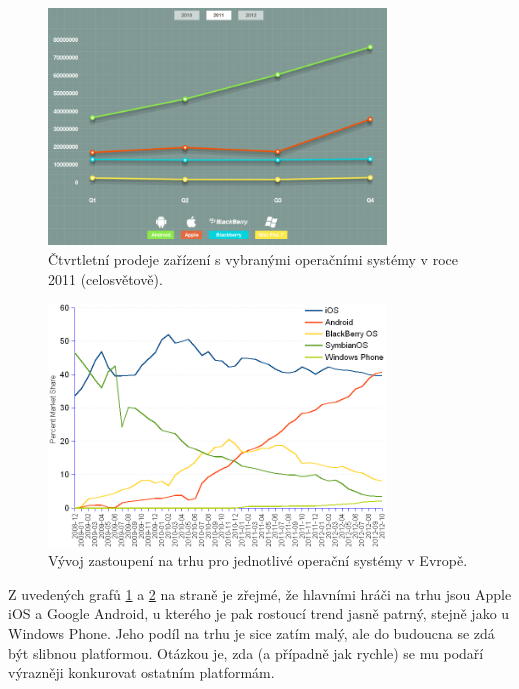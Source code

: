 \documentclass[thesis=M,czech]{FITthesis}[2012/06/26]
\begin{document}
\begin{figure}[p]\centering
	\includegraphics[width=0.8\textwidth]{figures/sales_2011}
	\caption{Čtvrtletní prodeje zařízení s vybranými operačními systémy v roce 2011 (celosvětově).\protect\cite{mobile_stats}}
	\label{fig:sales_world}
\end{figure}
\begin{figure}[p]\centering
	\includegraphics[width=0.8\textwidth]{figures/mobios_eu_timeseries_800x574}
	\caption{Vývoj zastoupení na trhu pro jednotlivé operační systémy v Evropě.\protect\cite{market_share}}
	\label{fig:sales_europe}
\end{figure}

Z uvedených grafů \ref{fig:sales_world} a \ref{fig:sales_europe} na straně \pageref{fig:sales_world} je zřejmé, že hlavními hráči na trhu jsou Apple iOS a Google Android, u kterého je pak rostoucí trend jasně patrný, stejně jako u Windows Phone. Jeho podíl na trhu je sice zatím malý, ale do budoucna se zdá být slibnou platformou. Otázkou je, zda (a případně jak rychle) se mu podaří výrazněji konkurovat ostatním platformám.
\end{document}
